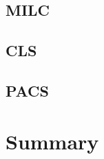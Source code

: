 \documentclass[a4paper,11pt]{article}
\begin{document}
\subsection{MILC}

\subsection{CLS}

\subsection{PACS}

\section{Summary}
\end{document}
